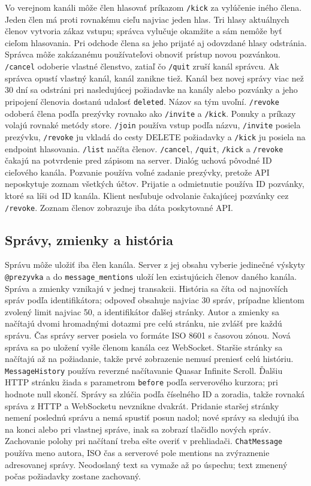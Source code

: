 \documentclass[11pt,a4paper]{article}
\begin{document}
Vo verejnom kanáli môže člen hlasovať príkazom \texttt{/kick} za vylúčenie
iného člena. Jeden člen má proti rovnakému cieľu najviac jeden hlas.
Tri hlasy aktuálnych členov vytvoria zákaz vstupu; správca vylučuje
okamžite a sám nemôže byť cieľom hlasovania. Pri odchode člena sa jeho
prijaté aj odovzdané hlasy odstránia. Správca môže zakázanému používateľovi
obnoviť prístup novou pozvánkou. \texttt{/cancel} odoberie vlastné členstvo,
zatiaľ čo \texttt{/quit} zruší kanál správcu. Ak správca opustí vlastný
kanál, kanál zanikne tiež. Kanál bez novej správy viac než 30 dní sa
odstráni pri nasledujúcej požiadavke na kanály alebo pozvánky a jeho
pripojení členovia dostanú udalosť \texttt{deleted}. Názov sa tým uvoľní.
\texttt{/revoke} odoberá člena podľa prezývky rovnako ako \texttt{/invite}
a \texttt{/kick}.
Ponuky a príkazy volajú rovnaké metódy store. \texttt{/join} používa
vstup podľa názvu, \texttt{/invite} posiela prezývku, \texttt{/revoke}
ju vkladá do cesty DELETE požiadavky a \texttt{/kick} ju posiela na
endpoint hlasovania. \texttt{/list} načíta členov. \texttt{/cancel},
\texttt{/quit}, \texttt{/kick} a \texttt{/revoke} čakajú na potvrdenie
pred zápisom na server. Dialóg uchová pôvodné ID cieľového kanála.
Pozvanie používa voľné zadanie prezývky, pretože API neposkytuje zoznam
všetkých účtov. Prijatie a odmietnutie používa ID pozvánky, ktoré sa
líši od ID kanála. Klient nesľubuje odvolanie čakajúcej pozvánky cez
\texttt{/revoke}. Zoznam členov zobrazuje iba dáta poskytované API.

\subsection{Správy, zmienky a história}
Správu môže uložiť iba člen kanála. Server z jej obsahu vyberie jedinečné
výskyty \texttt{@prezyvka} a do \texttt{message\_mentions} uloží len
existujúcich členov daného kanála. Správa a zmienky vznikajú v jednej
transakcii. História sa číta od najnovších správ podľa identifikátora;
odpoveď obsahuje najviac 30 správ, prípadne klientom zvolený limit najviac
50, a identifikátor ďalšej stránky. Autor a zmienky sa načítajú dvomi
hromadnými dotazmi pre celú stránku, nie zvlášť pre každú správu. Čas
správy server posiela vo formáte ISO 8601 s časovou zónou. Nová správa sa po uložení vyšle členom
kanála cez WebSocket. Staršie stránky sa načítajú až na požiadanie, takže
prvé zobrazenie nemusí preniesť celú históriu.
\texttt{MessageHistory} používa reverzné načítavanie Quasar Infinite
Scroll. Ďalšiu HTTP stránku žiada s parametrom \texttt{before} podľa
serverového kurzora; pri hodnote null skončí. Správy sa zlúčia podľa
číselného ID a zoradia, takže rovnaká správa z HTTP a WebSocketu
nevznikne dvakrát. Pridanie staršej stránky nemení poslednú správu
a nemá spustiť posun nadol; nové správy sa sledujú iba na konci alebo
pri vlastnej správe, inak sa zobrazí tlačidlo nových správ. Zachovanie
polohy pri načítaní treba ešte overiť v prehliadači.
\texttt{ChatMessage} používa meno autora, ISO čas a serverové pole
mentions na zvýraznenie adresovanej správy. Neodoslaný text sa vymaže
až po úspechu; text zmenený počas požiadavky zostane zachovaný.
\end{document}
